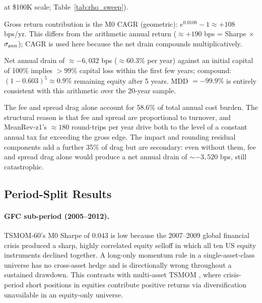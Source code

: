 \documentclass[12pt]{article}
\begin{document}
\begin{table}[H]
\begin{tablenotes}
  at \$100K scale; Table~\ref{tab:rho_sweep}).
\item Gross return contribution is the M0 CAGR (geometric): $e^{0.0108} - 1
  \approx +108$ bps/yr. This differs from the arithmetic annual return
  ($\approx +190$ bps = Sharpe $\times$ $\sigma_{\rm ann}$); CAGR is used
  here because the net drain compounds multiplicatively.
\item Net annual drain of $\approx -6{,}032$ bps ($\approx 60.3\%$ per
  year) against an initial capital of 100\% implies $> 99\%$ capital loss
  within the first few years; compound: $(1-0.603)^5 \approx 0.9\%$
  remaining equity after 5 years. MDD $= -99.9\%$ is entirely consistent
  with this arithmetic over the 20-year sample.
\end{tablenotes}
\end{table}

The fee and spread drag alone account for 58.6\% of total annual cost
burden. The structural reason is that fee and spread are proportional
to turnover, and MeanRev-z1's $\approx 180$ round-trips per year drive
both to the level of a constant annual tax far exceeding the gross edge.
The impact and rounding residual components add a further 35\% of drag
but are secondary: even without them, fee and spread drag alone would
produce a net annual drain of $\sim -3{,}520$ bps, still catastrophic.

\subsection{Period-Split Results}
\label{sec:period_results}

\begin{table}[H]
\centering
\caption{Period-split Sharpe ratios for M0, M1, and M4 across all three
strategies and four evaluation windows. Bootstrap CIs are not reported
for sub-periods; shorter windows produce materially wider uncertainty.
All sub-period estimates should be treated as qualitative indicators
of regime-dependence rather than statistically precise measurements.}
\label{tab:period}
\small

\end{table}

\paragraph{GFC sub-period (2005--2012).}
TSMOM-60's M0 Sharpe of 0.043 is low because the 2007--2009 global
financial crisis produced a sharp, highly correlated equity selloff in
which all ten US equity instruments declined together. A long-only
momentum rule in a single-asset-class universe has no cross-asset
hedge and is directionally wrong throughout a sustained drawdown.
This contrasts with multi-asset TSMOM \citep{moskowitz2012time,hurst2017century},
where crisis-period short positions in equities contribute positive
returns via diversification unavailable in an equity-only universe.
\end{document}
